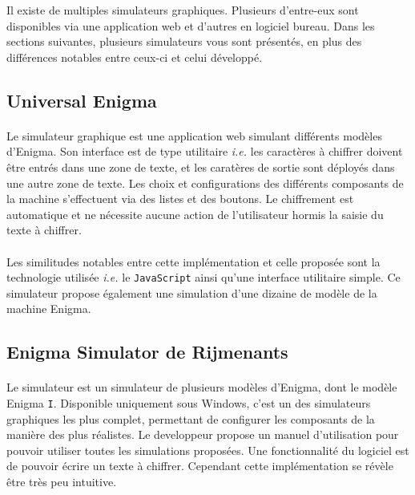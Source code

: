 \documentclass[letterpaper]{article}
\begin{document}
Il existe de multiples simulateurs graphiques. Plusieurs d'entre-eux sont disponibles via une application web et d'autres en logiciel bureau. Dans les sections suivantes, plusieurs simulateurs vous sont présentés, en plus des différences notables entre ceux-ci et celui développé.

\subsection{Universal Enigma}

\paragraph{}

Le simulateur graphique \cite{UEN} est une application web simulant différents modèles d'Enigma. Son interface est de type utilitaire \textit{i.e.} les caractères à chiffrer doivent être entrés dans une zone de texte, et les caratères de sortie sont déployés dans une autre zone de texte. Les choix et configurations des différents composants de la machine s'effectuent via des listes et des boutons. Le chiffrement est automatique et ne nécessite aucune action de l'utilisateur hormis la saisie du texte à chiffrer.

\paragraph{}

Les similitudes notables entre cette implémentation et celle proposée sont la technologie utilisée \textit{i.e.} le \texttt{JavaScript} ainsi qu'une interface utilitaire simple. Ce simulateur propose également une simulation d'une dizaine de modèle de la machine Enigma.

\subsection{Enigma Simulator de Rijmenants}

\paragraph{}

Le simulateur \cite{EWIN} est un simulateur de plusieurs modèles d'Enigma, dont le modèle Enigma \texttt{I}. Disponible uniquement sous Windows, c'est un des simulateurs graphiques les plus complet, permettant de configurer les composants de la manière des plus réalistes. Le developpeur propose un manuel d'utilisation pour pouvoir utiliser toutes les simulations proposées. Une fonctionnalité du logiciel est de pouvoir écrire un texte à chiffrer. Cependant cette implémentation se révèle être très peu intuitive.
\end{document}
